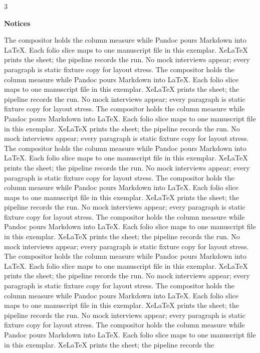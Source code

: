 \documentclass[
]{article}
\begin{document}
\begin{multicols}{3}

\textbf{Notices}

The compositor holds the column measure while Pandoc pours Markdown into
LaTeX. Each folio slice maps to one manuscript file in this exemplar.
XeLaTeX prints the sheet; the pipeline records the run. No mock
interviews appear; every paragraph is static fixture copy for layout
stress. The compositor holds the column measure while Pandoc pours
Markdown into LaTeX. Each folio slice maps to one manuscript file in
this exemplar. XeLaTeX prints the sheet; the pipeline records the run.
No mock interviews appear; every paragraph is static fixture copy for
layout stress. The compositor holds the column measure while Pandoc
pours Markdown into LaTeX. Each folio slice maps to one manuscript file
in this exemplar. XeLaTeX prints the sheet; the pipeline records the
run. No mock interviews appear; every paragraph is static fixture copy
for layout stress. The compositor holds the column measure while Pandoc
pours Markdown into LaTeX. Each folio slice maps to one manuscript file
in this exemplar. XeLaTeX prints the sheet; the pipeline records the
run. No mock interviews appear; every paragraph is static fixture copy
for layout stress. The compositor holds the column measure while Pandoc
pours Markdown into LaTeX. Each folio slice maps to one manuscript file
in this exemplar. XeLaTeX prints the sheet; the pipeline records the
run. No mock interviews appear; every paragraph is static fixture copy
for layout stress. The compositor holds the column measure while Pandoc
pours Markdown into LaTeX. Each folio slice maps to one manuscript file
in this exemplar. XeLaTeX prints the sheet; the pipeline records the
run. No mock interviews appear; every paragraph is static fixture copy
for layout stress. The compositor holds the column measure while Pandoc
pours Markdown into LaTeX. Each folio slice maps to one manuscript file
in this exemplar. XeLaTeX prints the sheet; the pipeline records the
run. No mock interviews appear; every paragraph is static fixture copy
for layout stress. The compositor holds the column measure while Pandoc
pours Markdown into LaTeX. Each folio slice maps to one manuscript file
in this exemplar. XeLaTeX prints the sheet; the pipeline records the
run. No mock interviews appear; every paragraph is static fixture copy
for layout stress. The compositor holds the column measure while Pandoc
pours Markdown into LaTeX. Each folio slice maps to one manuscript file
in this exemplar. XeLaTeX prints the sheet; the pipeline records the

\end{multicols}
\end{document}

